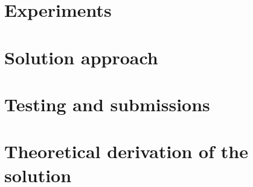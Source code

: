 \section{Experiments}
%

\section{Solution approach}


\section{Testing and submissions}

\section{Theoretical derivation of the solution}



